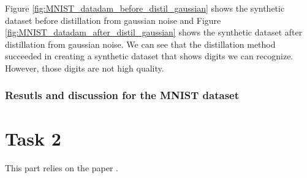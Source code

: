 \documentclass[onecolumn]{IEEEtran}
\begin{document}
Figure \ref{fig:MNIST_datadam_before_distil_gaussian} shows the synthetic dataset before distillation from gaussian noise and Figure \ref{fig:MNIST_datadam_after_distil_gaussian} shows the synthetic dataset after distillation from gaussian noise. We can see that the distillation method succeeded in creating a synthetic dataset that shows digits we can recognize. However, those digits are not high quality.
\\
\subsubsection{Resutls and discussion for the MNIST dataset}

\section{Task 2}
This part relies on the paper \cite{li2024prioritize}.
\end{document}
